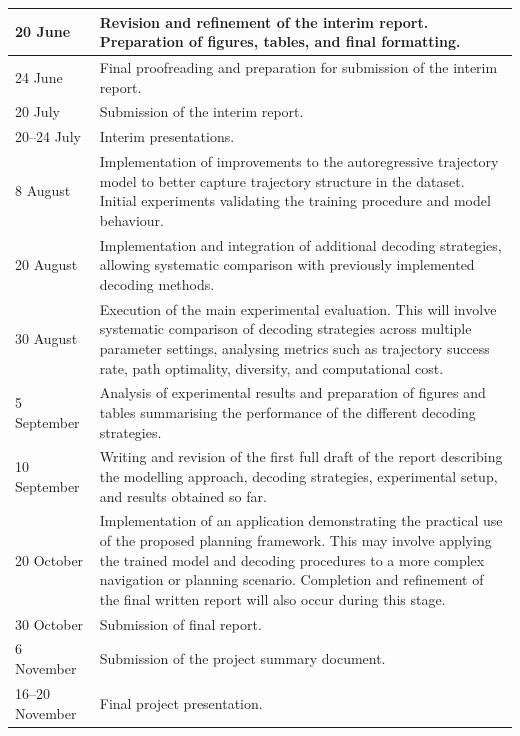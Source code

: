 \documentclass[12pt]{article}
\begin{document}
\begin{longtable}{|p{3cm}|p{11cm}|}
20 June &
Revision and refinement of the interim report. Preparation of figures, tables, and final formatting. \\
\hline

24 June &
Final proofreading and preparation for submission of the interim report. \\
\hline

20 July &
Submission of the interim report. \\
\hline

20--24 July &
Interim presentations. \\
\hline

8 August &
Implementation of improvements to the autoregressive trajectory model to better capture trajectory structure in the dataset. Initial experiments validating the training procedure and model behaviour. \\
\hline

20 August &
Implementation and integration of additional decoding strategies, allowing systematic comparison with previously implemented decoding methods. \\
\hline

30 August &
Execution of the main experimental evaluation. This will involve systematic comparison of decoding strategies across multiple parameter settings, analysing metrics such as trajectory success rate, path optimality, diversity, and computational cost. \\
\hline

5 September &
Analysis of experimental results and preparation of figures and tables summarising the performance of the different decoding strategies. \\
\hline

10 September &
Writing and revision of the first full draft of the report describing the modelling approach, decoding strategies, experimental setup, and results obtained so far. \\
\hline

20 October &
Implementation of an application demonstrating the practical use of the proposed planning framework. This may involve applying the trained model and decoding procedures to a more complex navigation or planning scenario. Completion and refinement of the final written report will also occur during this stage. \\
\hline

30 October &
Submission of final report. \\
\hline

6 November &
Submission of the project summary document. \\
\hline

16--20 November &
Final project presentation. \\
\hline

\end{longtable}
\end{document}
